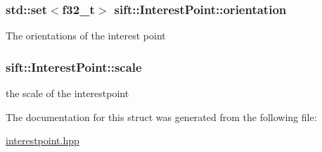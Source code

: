 \subsubsection[{orientation}]{\setlength{\rightskip}{0pt plus 5cm}std\+::set$<${\bf f32\+\_\+t}$>$ sift\+::\+Interest\+Point\+::orientation}\label{structsift_1_1InterestPoint_adbf265440c475aad71f31d8e81306a8b}
The orientations of the interest point \hypertarget{structsift_1_1InterestPoint_abcdd744160459cfbd2330b5d6b8a2926}{}
\subsubsection[{scale}]{ sift\+::\+Interest\+Point\+::scale}\label{structsift_1_1InterestPoint_abcdd744160459cfbd2330b5d6b8a2926}
the scale of the interestpoint 

The documentation for this struct was generated from the following file\+:\begin{DoxyCompactItemize}
\item 
\hyperlink{interestpoint_8hpp}{interestpoint.\+hpp}\end{DoxyCompactItemize}
